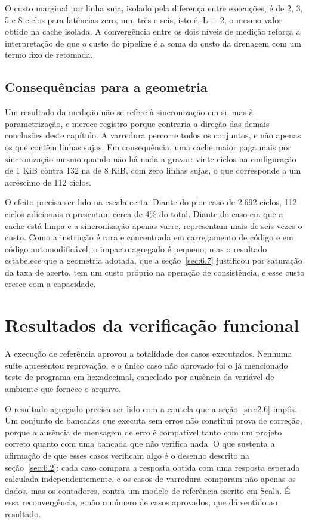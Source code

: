 O custo marginal por linha suja, isolado pela diferença entre execuções, é de 2, 3, 5 e 8 ciclos para latências zero, um, três e seis, isto é, L + 2, o mesmo valor obtido na cache isolada. A convergência entre os dois níveis de medição reforça a interpretação de que o custo do pipeline é a soma do custo da drenagem com um termo fixo de retomada.

\subsection{Consequências para a geometria}\label{sec:6.3.3}

Um resultado da medição não se refere à sincronização em si, mas à parametrização, e merece registro porque contraria a direção das demais conclusões deste capítulo. A varredura percorre todos os conjuntos, e não apenas os que contêm linhas sujas. Em consequência, uma cache maior paga mais por sincronização mesmo quando não há nada a gravar: vinte ciclos na configuração de 1 KiB contra 132 na de 8 KiB, com zero linhas sujas, o que corresponde a um acréscimo de 112 ciclos.

O efeito precisa ser lido na escala certa. Diante do pior caso de 2.692 ciclos, 112 ciclos adicionais representam cerca de 4\% do total. Diante do caso em que a cache está limpa e a sincronização apenas varre, representam mais de seis vezes o custo. Como a instrução é rara e concentrada em carregamento de código e em código automodificável, o impacto agregado é pequeno; mas o resultado estabelece que a geometria adotada, que a seção~\ref{sec:6.7} justificou por saturação da taxa de acerto, tem um custo próprio na operação de consistência, e esse custo cresce com a capacidade.

\section{Resultados da verificação funcional}\label{sec:6.4}

A execução de referência aprovou a totalidade dos casos executados. Nenhuma suíte apresentou reprovação, e o único caso não aprovado foi o já mencionado teste de programa em hexadecimal, cancelado por ausência da variável de ambiente que fornece o arquivo.

O resultado agregado precisa ser lido com a cautela que a seção~\ref{sec:2.6} impôs. Um conjunto de bancadas que executa sem erros não constitui prova de correção, porque a ausência de mensagem de erro é compatível tanto com um projeto correto quanto com uma bancada que não verifica nada. O que sustenta a afirmação de que esses casos verificam algo é o desenho descrito na seção~\ref{sec:6.2}: cada caso compara a resposta obtida com uma resposta esperada calculada independentemente, e os casos de varredura comparam não apenas os dados, mas os contadores, contra um modelo de referência escrito em Scala. É essa reconvergência, e não o número de casos aprovados, que dá sentido ao resultado.

